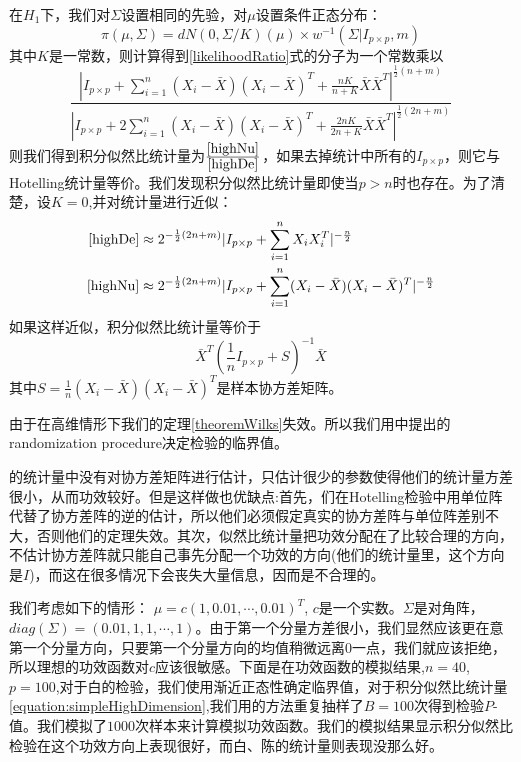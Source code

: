 \documentclass[review]{elsarticle}
\begin{document}
在$H_1$下，我们对$\Sigma$设置相同的先验，对$\mu$设置条件正态分布：
\begin{equation}
    \pi(\mu,\Sigma)=dN(0,\Sigma/K)(\mu)\times w^{-1}(\Sigma|I_{p\times p},m)
\end{equation}
其中$K$是一常数，则计算得到\eqref{likelihoodRatio}式的分子为一个常数乘以
\begin{equation}\label{highNu}
    \frac{
        |I_{p\times p}+\sum^n_{i=1} (X_i-\bar{X}) (X_i-\bar{X})^T+\frac{nK}{n+K}\bar{X}\bar{X}^T|^{\frac{1}{2}(n+m)}
    }{
        |I_{p\times p}+2\sum^n_{i=1} (X_i-\bar{X}) (X_i-\bar{X})^T+\frac{2nK}{2n+K}\bar{X}\bar{X}^T|^{\frac{1}{2}(2n+m)}
    }
\end{equation}
则我们得到积分似然比统计量为$\frac{\eqref{highNu}}{\eqref{highDe}}$，如果去掉统计中所有的$I_{p\times p}$，则它与Hotelling统计量等价。我们发现积分似然比统计量即使当$p>n$时也存在。为了清楚，设$K=0$,并对统计量进行近似：
\begin{equation}
    \begin{aligned}
        \eqref{highDe}&\approx   2^{-\frac{1}{2}(2n+m)}|I_{p\times p}+\sum^n_{i=1} X_i X_i^T|^{-\frac{n}{2}}
    \\
    \eqref{highNu}&\approx   2^{-\frac{1}{2}(2n+m)}|I_{p\times p}+\sum^n_{i=1} (X_i-\bar{X}) (X_i-\bar{X})^T|^{-\frac{n}{2}}
    \end{aligned}
\end{equation}
如果这样近似，积分似然比统计量等价于
\begin{equation}\label{equation:simpleHighDimension}
    \bar{X}^T(\frac{1}{n}I_{p\times p}+S)^{-1}\bar{X}
\end{equation}
其中$S=\frac{1}{n}(X_i-\bar{X})(X_i-\bar{X})^T$是样本协方差矩阵。

由于在高维情形下我们的定理\ref{theoremWilks}失效。所以我们用\cite{Zhao2016A}中提出的randomization procedure决定检验的临界值。

\cite{Bai1996Effect}的统计量中没有对协方差矩阵进行估计，只估计很少的参数使得他们的统计量方差很小，从而功效较好。但是这样做也优缺点:首先，们在Hotelling检验中用单位阵代替了协方差阵的逆的估计，所以他们必须假定真实的协方差阵与单位阵差别不大，否则他们的定理失效。其次，似然比统计量把功效分配在了比较合理的方向，不估计协方差阵就只能自己事先分配一个功效的方向(他们的统计量里，这个方向是$I$)，而这在很多情况下会丧失大量信息，因而是不合理的。

我们考虑如下的情形： $\mu=c(1,0.01,\cdots,0.01)^T$, $c$是一个实数。$\Sigma$是对角阵，$diag(\Sigma)=(0.01,1,1,\cdots,1)$。由于第一个分量方差很小，我们显然应该更在意第一个分量方向，只要第一个分量方向的均值稍微远离$0$一点，我们就应该拒绝，所以理想的功效函数对$c$应该很敏感。下面是在功效函数的模拟结果,$n=40$,
$p=100$,对于白的检验，我们使用渐近正态性确定临界值，对于积分似然比统计量\eqref{equation:simpleHighDimension},我们用\cite{Zhao2016A}的方法重复抽样了$B=100$次得到检验$P$-值。我们模拟了$1000$次样本来计算模拟功效函数。我们的模拟结果显示积分似然比检验在这个功效方向上表现很好，而白、陈的统计量则表现没那么好。
\end{document}
